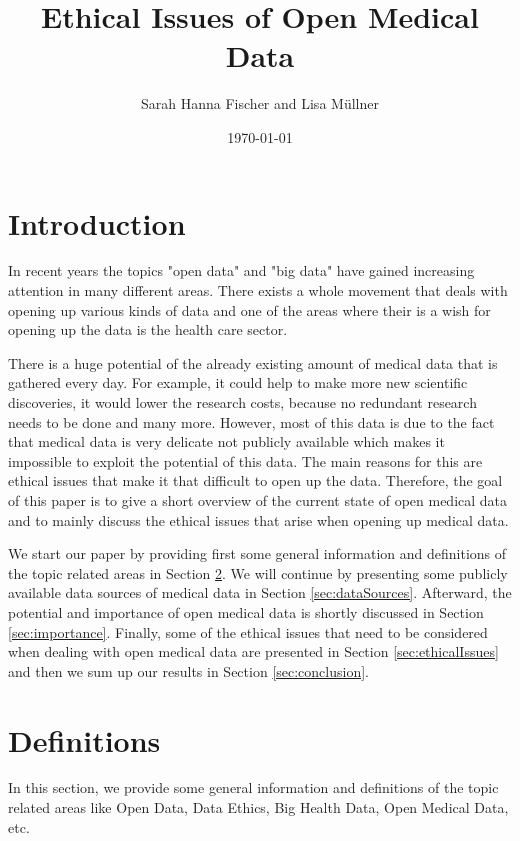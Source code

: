 \documentclass[a4paper, 11pt]{article}
\title{Ethical Issues of Open Medical Data}
\begin{document}
\date{\today}
\author{Sarah Hanna Fischer and Lisa Müllner}
\maketitle


\begin{abstract}


\end{abstract}

\section{Introduction} \label{sec:intro}
In recent years the topics "open data" and "big data" have gained increasing attention in many different areas. There exists a whole movement that deals with opening up various kinds of data and one of the areas where their is a wish for opening up the data is the health care sector. \cite{kitchin2014dataRevolution} 

There is a huge potential of the already existing amount of medical data that is gathered every day. For example, it could help to make more new scientific discoveries, it would lower the research costs, because no redundant research needs to be done and many more. However, most of this data is due to the fact that medical data is very delicate not publicly available which makes it impossible to exploit the potential of this data. The main reasons for this are ethical issues that make it that difficult to open up the data. Therefore, the goal of this paper is to give a short overview of the current state of open medical data and to mainly discuss the ethical issues that arise when opening up medical data. 

We start our paper by providing first some general information and definitions of the topic related areas in Section \ref{sec:definitions}. We will continue by presenting some publicly available data sources of medical data in Section \ref{sec:dataSources}. Afterward, the potential and importance of open medical data is shortly discussed in Section \ref{sec:importance}. Finally, some of the ethical issues that need to be considered when dealing with open medical data are presented in Section \ref{sec:ethicalIssues} and then we sum up our results in Section \ref{sec:conclusion}.

\section{Definitions}\label{sec:definitions}
In this section, we provide some general information and definitions of the topic related areas like Open Data, Data Ethics, Big Health Data, Open Medical Data, etc. 
\end{document}
